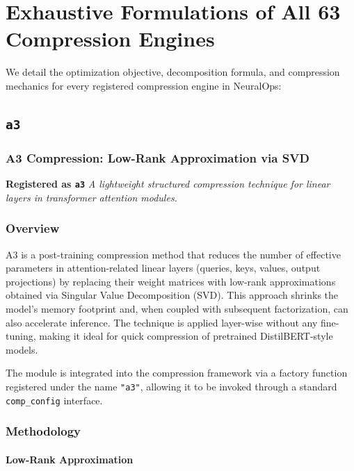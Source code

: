\section{Exhaustive Formulations of All 63 Compression Engines}
\label{app:full_compressor_details}

We detail the optimization objective, decomposition formula, and compression mechanics for every registered compression engine in NeuralOps:

\subsection{\texttt{a3}}
\subsubsection*{A3 Compression: Low-Rank Approximation via SVD}

\textbf{Registered as \texttt{a3}}
\textit{A lightweight structured compression technique for linear layers in transformer attention modules.}


\subsubsection*{Overview}

A3 is a post-training compression method that reduces the number of effective parameters in attention-related linear layers (queries, keys, values, output projections) by replacing their weight matrices with low-rank approximations obtained via Singular Value Decomposition (SVD). This approach shrinks the model's memory footprint and, when coupled with subsequent factorization, can also accelerate inference. The technique is applied layer-wise without any fine-tuning, making it ideal for quick compression of pretrained DistilBERT-style models.

The module is integrated into the compression framework via a factory function registered under the name \texttt{"a3"}, allowing it to be invoked through a standard \texttt{comp\_config} interface.


\subsubsection*{Methodology}

\paragraph{Low-Rank Approximation}

